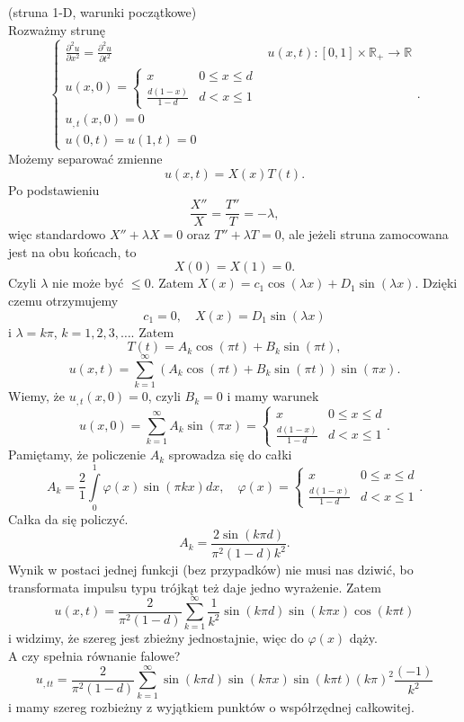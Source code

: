 \documentclass[../main.tex]{subfiles}
\begin{document}
		\begin{przyklad}
				(struna 1-D, warunki początkowe)\\
				Rozważmy strunę
				\[
				\begin{cases}
						\frac{\partial ^2u}{\partial x^2} = \frac{\partial ^2u}{\partial t^2} & u(x,t): [0,1]\times\mathbb{R}_+\to \mathbb{R}\\
						u(x,0) = \begin{cases}
								x& 0\le x \le d\\
								\frac{d(1-x)}{1-d}&d < x \le 1
						\end{cases}\\
						u_{,t}(x,0) = 0 \\
						u(0,t) = u(1,t) = 0
				\end{cases}
				.\]
				Możemy separować zmienne
				\[
						u(x,t) = X(x) T(t)
				.\]
				Po podstawieniu
				\[
						\frac{X''}{X} = \frac{T''}{T} = -\lambda
				,\]
				więc standardowo $X'' + \lambda X = 0$ oraz $T'' + \lambda T = 0$, ale jeżeli struna zamocowana jest na obu końcach, to
				\[
						X(0) = X(1) = 0
				.\]
				Czyli $\lambda$ nie może być $\le 0$. Zatem $X(x) = c_1 \cos(\lambda x) + D_1 \sin(\lambda x)$. Dzięki czemu otrzymujemy
				\[
						c_1 = 0,\quad X(x) = D_1 \sin(\lambda x)
				\]
				i $\lambda = k\pi$, $k=1,2,3,\ldots$. Zatem
				 \[
						 T(t) = A_k \cos(\pi t) + B_k \sin (\pi t)
				,\]
				\[
						u(x,t) = \sum_{k=1}^{\infty} \left( A_k \cos(\pi t) + B_k \sin (\pi t) \right) \sin(\pi x)
				.\]
				Wiemy, że $u_{,t}(x,0) = 0$, czyli $B_k = 0$ i mamy warunek
				\[
						u(x,0) = \sum_{k=1}^{\infty} A_k \sin(\pi x) = \begin{cases}
								x & 0\le x \le d\\
								\frac{d(1-x)}{1-d} & d < x \le 1
						\end{cases}
				.\]
				Pamiętamy, że policzenie $A_k$ sprowadza się do całki
				\[
						A_k = \frac{2}{1}\int\limits_0^1 \varphi(x) \sin(\pi k x)dx,\quad \varphi(x) = \begin{cases}
								x&0\le x\le d\\
								\frac{d(1-x)}{1-d}& d<x\le 1
						\end{cases}
				.\]
				Całka da się policzyć.
				 \[
						 A_k = \frac{2 \sin(k\pi d)}{\pi^2 (1-d) k^2}
				.\]
				Wynik w postaci jednej funkcji (bez przypadków) nie musi nas dziwić, bo transformata impulsu typu trójkąt też daje jedno wyrażenie. Zatem
				\[
						u(x,t) = \frac{2}{\pi^2(1-d)} \sum_{k=1}^{\infty} \frac{1}{k^2}\sin(k \pi d) \sin(k \pi x) \cos(k \pi t)
				\]
				i widzimy, że szereg jest zbieżny jednostajnie, więc do $\varphi(x)$ dąży.\\
				A czy spełnia równanie falowe?
				\[
						u_{,t t} = \frac{2}{\pi^2(1-d)} \sum_{k=1}^{\infty} \sin(k \pi d) \sin(k \pi x)\sin(k \pi t) (k\pi)^2 \frac{(-1)}{k^2}
				\]
				i mamy szereg rozbieżny z wyjątkiem punktów o współrzędnej całkowitej.		\end{przyklad}
\end{document}
